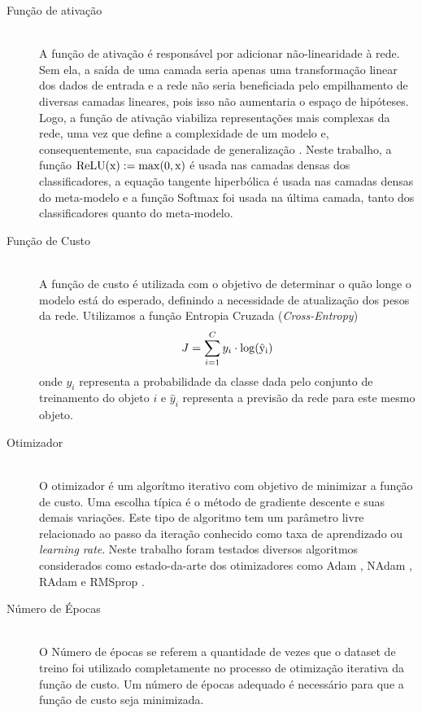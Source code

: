 \begin{description}
  \item[Função de ativação] \hfill \\
        A função de ativação é responsável por adicionar não-linearidade à rede. Sem ela, a saída de uma camada seria apenas uma transformação linear dos dados de entrada e a rede não seria beneficiada pelo empilhamento de diversas camadas lineares, pois isso não aumentaria o espaço de hipóteses. Logo, a função de ativação viabiliza representações mais complexas da rede, uma vez que define a complexidade de um modelo e, consequentemente, sua capacidade de generalização \cite{CholletBook}. Neste trabalho, a função $\rm{ReLU}(x) := \rm{max}(0, x)$ é usada nas camadas densas dos classificadores, a equação tangente hiperbólica é usada nas camadas densas do meta-modelo e a função Softmax \cite{Bridle1990} foi usada na última camada, tanto dos classificadores quanto do meta-modelo.

  \item[Função de Custo] \hfill \\
        A função de custo é utilizada com o objetivo de determinar o quão longe o modelo está do esperado, definindo a necessidade de atualização dos pesos da rede. Utilizamos a função Entropia Cruzada (\emph{Cross-Entropy})
        \begin{equation}
          \label{eq:custo}
          J = \sum_{i=1}^{C} y_i \cdot \rm{log}(\hat{y}_i)
        \end{equation}
        onde $y_i$ representa a probabilidade da classe dada pelo conjunto de treinamento do objeto $i$ e $\hat{y}_i$ representa a previsão da rede para este mesmo objeto.

  \item[Otimizador] \hfill \\
        O otimizador é um algorítmo iterativo com objetivo de minimizar a função de custo. Uma escolha típica é o método de gradiente descente e suas demais variações. Este tipo de algoritmo tem um parâmetro livre relacionado ao passo da iteração conhecido como taxa de aprendizado ou \textit{learning rate}. Neste trabalho foram testados diversos algoritmos considerados como estado-da-arte dos otimizadores como Adam \cite{Adam}, NAdam \cite{NAdam}, RAdam \cite{RAdam} e RMSprop \cite{RMSprop}.

  \item[Número de Épocas] \hfill \\
        O Número de épocas se referem a quantidade de vezes que o dataset de treino foi utilizado completamente no processo de otimização iterativa da função de custo. Um número de épocas adequado é necessário para que a função de custo seja minimizada.


\end{description}
